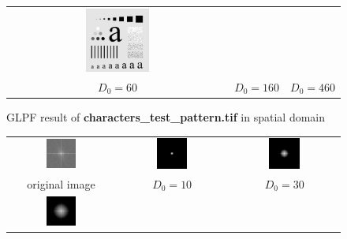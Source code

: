 \documentclass[11pt,a4paper]{article}
\begin{document}
\begin{figure}[!htbp]
\begin{tabular}{ccc}
		\includegraphics[width=0.3\textwidth]{pro3/GLPF/GLPF_460} \\
		 $D_0=60$ &  $D_0=160$ &  $D_0=460$
	\end{tabular}
	\caption{GLPF result of \textbf{characters\_test\_pattern.tif} in spatial domain}
	\label{pro3_fig3}
\end{figure}

\begin{figure}[!htbp]
	\centering
	\begin{tabular}{ccc} 
		\includegraphics[width=0.3\textwidth]{pro3/org_spectrum}&
		\includegraphics[width=0.3\textwidth]{pro3/GLPF/GLPF_10_spectrum}&
		\includegraphics[width=0.3\textwidth]{pro3/GLPF/GLPF_30_spectrum} \\
		original image &  $D_0=10$ &  $D_0=30$\\
		\includegraphics[width=0.3\textwidth]{pro3/GLPF/GLPF_60_spectrum}&

\end{tabular}
\end{figure}
\end{document}
